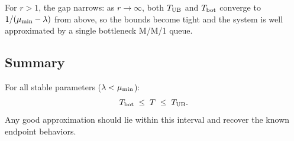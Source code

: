 For $r > 1$, the gap narrows: as $r \to \infty$, both $T_{\text{UB}}$ and $T_{\text{bot}}$
converge to $1/(\mu_{\min} - \lambda)$ from above, so the bounds become tight and
the system is well approximated by a single bottleneck M/M/1 queue.

\subsection{Summary}

For all stable parameters ($\lambda < \mu_{\min}$):
\begin{equation}
  T_{\text{bot}} \;\leq\; T \;\leq\; T_{\text{UB}}.
\end{equation}
Any good approximation should lie within this interval and recover the known
endpoint behaviors.
